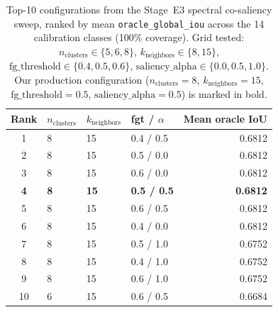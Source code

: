 \begin{table}[t]
\centering
\caption{Top-10 configurations from the Stage~E3 spectral co-saliency sweep,
ranked by mean \texttt{oracle\_global\_iou} across the 14 calibration classes
(100\% coverage). Grid tested: $n_{\text{clusters}} \in \{5,6,8\}$,
$k_{\text{neighbors}} \in \{8,15\}$,
$\text{fg\_threshold} \in \{0.4,0.5,0.6\}$,
$\text{saliency\_alpha} \in \{0.0,0.5,1.0\}$. Our production configuration
($n_{\text{clusters}}=8$, $k_{\text{neighbors}}=15$,
$\text{fg\_threshold}=0.5$, $\text{saliency\_alpha}=0.5$) is marked in bold.}
\label{tab:e3-sweep-top10}
\begin{tabular}{@{}clllr@{}}
\toprule
\textbf{Rank} & \textbf{$n_{\text{clusters}}$} & \textbf{$k_{\text{neighbors}}$} & \textbf{fgt / $\alpha$} & \textbf{Mean oracle IoU} \\
\midrule
1  & 8 & 15 & 0.4 / 0.5 & 0.6812 \\
2  & 8 & 15 & 0.5 / 0.0 & 0.6812 \\
3  & 8 & 15 & 0.6 / 0.0 & 0.6812 \\
\textbf{4}  & \textbf{8} & \textbf{15} & \textbf{0.5 / 0.5} & \textbf{0.6812} \\
5  & 8 & 15 & 0.6 / 0.5 & 0.6812 \\
6  & 8 & 15 & 0.4 / 0.0 & 0.6812 \\
7  & 8 & 15 & 0.5 / 1.0 & 0.6752 \\
8  & 8 & 15 & 0.4 / 1.0 & 0.6752 \\
9  & 8 & 15 & 0.6 / 1.0 & 0.6752 \\
10 & 6 & 15 & 0.6 / 0.5 & 0.6684 \\
\bottomrule
\end{tabular}
\end{table}


